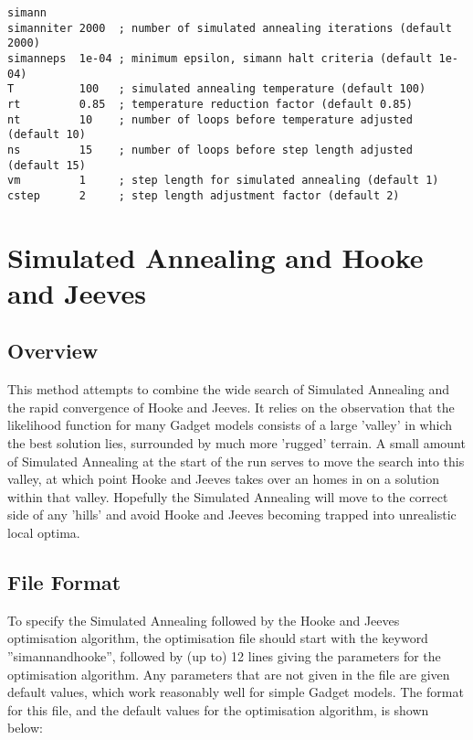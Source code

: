 \documentclass [a4paper, 10pt]{book}
\begin{document}
{\small\begin{verbatim}
simann
simanniter 2000  ; number of simulated annealing iterations (default 2000)
simanneps  1e-04 ; minimum epsilon, simann halt criteria (default 1e-04)
T          100   ; simulated annealing temperature (default 100)
rt         0.85  ; temperature reduction factor (default 0.85)
nt         10    ; number of loops before temperature adjusted (default 10)
ns         15    ; number of loops before step length adjusted (default 15)
vm         1     ; step length for simulated annealing (default 1)
cstep      2     ; step length adjustment factor (default 2)
\end{verbatim}}

\section{Simulated Annealing and Hooke and Jeeves}\label{sec:simannandhooke}
\subsection{Overview}
This method attempts to combine the wide search of Simulated Annealing and the rapid convergence of Hooke and Jeeves.  It relies on the observation that the likelihood function for many Gadget models consists of a large 'valley' in which the best solution lies, surrounded by much more 'rugged' terrain.  A small amount of Simulated Annealing at the start of the run serves to move the search into this valley, at which point Hooke and Jeeves takes over an homes in on a solution within that valley.  Hopefully the Simulated Annealing will move to the correct side of any 'hills' and avoid Hooke and Jeeves becoming trapped into unrealistic local optima.

\subsection{File Format}
To specify the Simulated Annealing followed by the Hooke and Jeeves optimisation algorithm, the optimisation file should start with the keyword ''simannandhooke'', followed by (up to) 12 lines giving the parameters for the optimisation algorithm.  Any parameters that are not given in the file are given default values, which work reasonably well for simple Gadget models.  The format for this file, and the default values for the optimisation algorithm, is shown below:
\end{document}
